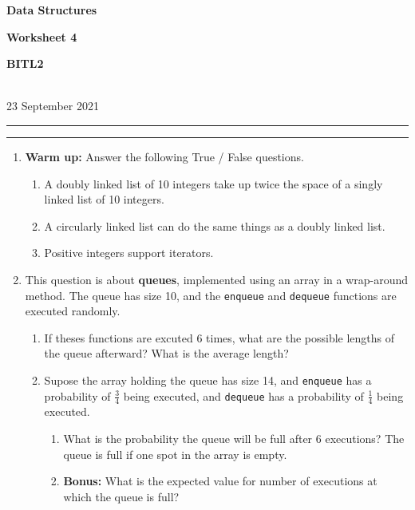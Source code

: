 \documentclass[a4paper,12pt]{article}
\begin{document}
\begin{center}
\parbox{3.5cm}{\textbf{Data Structures}} \hfill {\bf\Huge Worksheet 4} \hfill \parbox{3.5cm}{\flushright\textbf{BITL2}} \\[5pt]
\rm\small 23 September 2021
\end{center}

\hrule\vspace{2pt}\hrule

\begin{enumerate}

\item \textbf{Warm up:} Answer the following True / False questions.
\begin{enumerate}
\item A doubly linked list of 10 integers take up twice the space of a singly linked list of 10 integers.
\item A circularly linked list can do the same things as a doubly linked list.
\item Positive integers support iterators.
\end{enumerate}

\item This question is about \textbf{queues}, implemented using an array in a wrap-around method. The queue has size 10, and the \texttt{enqueue} and \texttt{dequeue} functions are executed randomly.
\begin{enumerate}
\item If theses functions are excuted 6 times, what are the possible lengths of the queue afterward? What is the average length?
\item Supose the array holding the queue has size 14, and \texttt{enqueue} has a probability of $\frac{3}4$ being executed, and \texttt{dequeue} has a probability of $\frac14$ being executed.
\begin{enumerate}
\item What is the probability the queue will be full after 6 executions? The queue is full if one spot in the array is empty.
\item \textbf{Bonus:} What is the expected value for number of executions at which the queue is full?
\end{enumerate}
\end{enumerate}
\end{enumerate}
\end{document}
